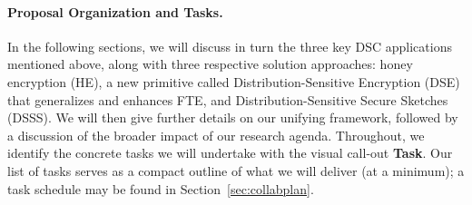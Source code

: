 {\paragraph{Proposal Organization and Tasks.} In the following sections, we will
discuss in turn the three key DSC applications mentioned above, along with
three respective solution approaches: honey encryption (HE), a new primitive
called Distribution-Sensitive Encryption (DSE) that generalizes and enhances FTE,
and Distribution-Sensitive Secure Sketches (DSSS). We will then give further
details on our unifying framework, followed by a discussion of the broader
impact of our research agenda.  Throughout, we identify the concrete tasks we
will undertake with the visual call-out {\bf Task}.  Our list of tasks serves
as a compact outline of what we will deliver (at a minimum); a task schedule
may be found in Section~\ref{sec:collabplan}.

}
